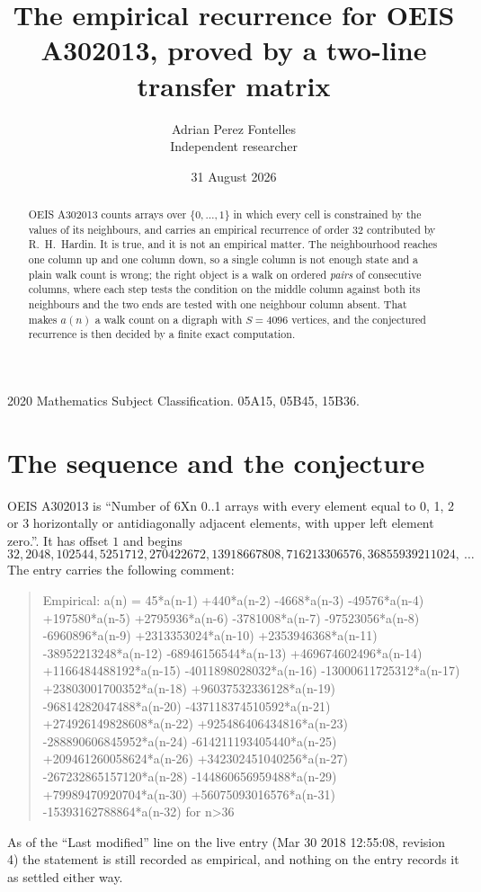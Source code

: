 \documentclass[11pt,a4paper]{article}
\title{The empirical recurrence for OEIS A302013, proved by a two-line transfer matrix}
\author{Adrian Perez Fontelles\\ \small Independent researcher}
\date{31 August 2026}
\theoremstyle{plain}
\theoremstyle{definition}
\begin{document}
\maketitle

\begin{abstract}
OEIS A302013 counts arrays over $\{0,\dots,1\}$ in which every cell is constrained by the
values of its neighbours, and carries an empirical recurrence of order $32$ contributed
by R.~H.~Hardin. It is true, and it is not an empirical matter. The neighbourhood reaches one
column up and one column down, so a single column is not enough state and a plain walk count
is wrong; the right object is a walk on ordered \emph{pairs} of consecutive columns, where
each step tests the condition on the middle column against both its neighbours and the two
ends are tested with one neighbour column absent. That makes $a(n)$ a walk count on a digraph
with $S=4096$ vertices, and the conjectured recurrence is then decided by a finite exact
computation.
\end{abstract}

\noindent\small 2020 Mathematics Subject Classification. 05A15, 05B45, 15B36.\normalsize

\section{The sequence and the conjecture}

OEIS A302013 is ``Number of 6Xn 0..1 arrays with every element equal to 0, 1, 2 or 3 horizontally or antidiagonally adjacent elements, with upper left element zero.''. It has offset $1$ and begins
\[
32, 2048, 102544, 5251712, 270422672, 13918667808, 716213306576, 36855939211024,\ \dots
\]
The entry carries the following comment:
\begin{quote}\small
Empirical: a(n) = 45*a(n-1) +440*a(n-2) -4668*a(n-3) -49576*a(n-4) +197580*a(n-5) +2795936*a(n-6) -3781008*a(n-7) -97523056*a(n-8) -6960896*a(n-9) +2313353024*a(n-10) +2353946368*a(n-11) -38952213248*a(n-12) -68946156544*a(n-13) +469674602496*a(n-14) +1166484488192*a(n-15) -4011898028032*a(n-16) -13000611725312*a(n-17) +23803001700352*a(n-18) +96037532336128*a(n-19) -96814282047488*a(n-20) -437118374510592*a(n-21) +274926149828608*a(n-22) +925486406434816*a(n-23) -288890606845952*a(n-24) -614211193405440*a(n-25) +209461260058624*a(n-26) +342302451040256*a(n-27) -267232865157120*a(n-28) -144860656959488*a(n-29) +79989470920704*a(n-30) +56075093016576*a(n-31) -15393162788864*a(n-32) for n>36
\end{quote}
As of the ``Last modified'' line on the live entry (Mar 30 2018 12:55:08, revision 4) the statement is
still recorded as empirical, and nothing on the entry records it as settled either way.
\end{document}
